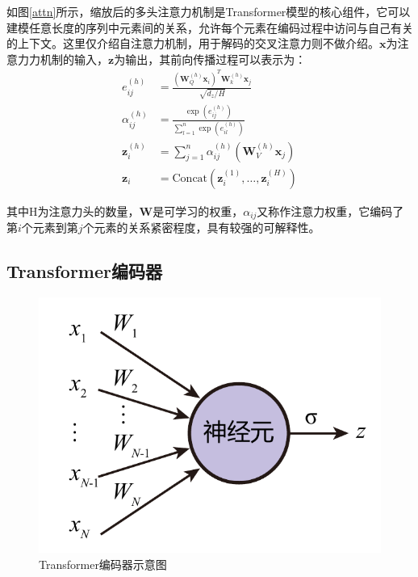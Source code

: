如图\ref{attn}所示，缩放后的多头注意力机制是Transformer模型的核心组件，它可以建模任意长度的序列中元素间的关系，允许每个元素在编码过程中访问与自己有关的上下文。这里仅介绍自注意力机制，用于解码的交叉注意力则不做介绍。$\bm{x}$为注意力力机制的输入，$\bm{z}$为输出，其前向传播过程可以表示为：
\begin{align}
    e_{ij}^{\left(h\right)}&=\frac{\left(\bm{W}_Q^{\left(h\right)}\bm{x}_i\right)^T\bm{W}_k^{\left(h\right)}\bm{x}_j}{\sqrt{d_z/H}} \label{attn-forward:1}\\
    \alpha_{ij}^{\left(h\right)}&=\frac{\exp{\left(e_{ij}^{\left(h\right)}\right)}}{\sum_{l=1}^{n}\exp{\left(e_{il}^{\left(h\right)}\right)}} \label{attn-forward:2}\\
    \bm{z}_i^{\left(h\right)}&=\sum_{j=1}^{n}{\alpha_{ij}^{\left(h\right)}\left(\bm{W}_V^{\left(h\right)}\bm{x}_j\right)}\\
    \bm{z}_i&=\mathrm{Concat}\left(\bm{z}_i^{\left(1\right)},\ldots,\bm{z}_i^{\left(H\right)}\right)  \label{attn-forward:4}
\end{align}

其中H为注意力头的数量，$\bm{W}$是可学习的权重，$\alpha_{ij}$又称作注意力权重，它编码了第$i$个元素到第$j$个元素的关系紧密程度，具有较强的可解释性。

\subsection{Transformer编码器}

\begin{figure}
    \centering
    \includegraphics[page=5,width=\linewidth]{figure/figures.pdf}
    \caption{Transformer编码器示意图\cite{attn17}}
    \label{trans-enc}
\end{figure}

